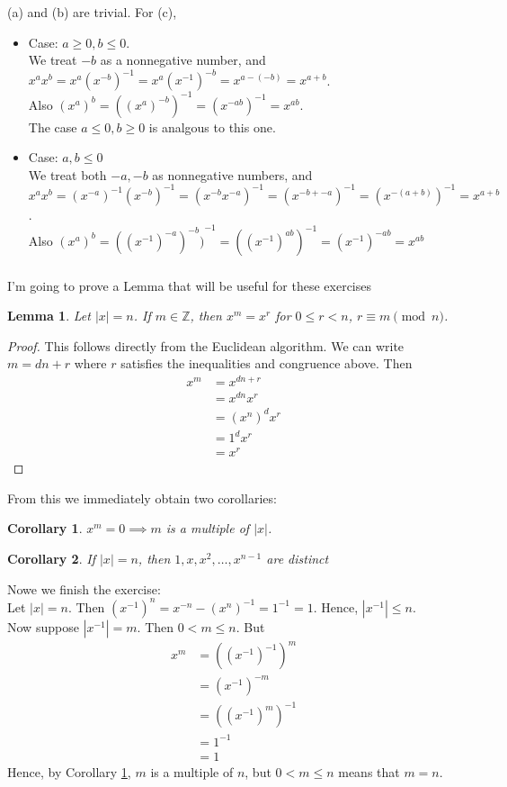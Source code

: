 \documentclass{article}
\newcommand{\ints}{\mathbb{Z}}
\newcommand{\inv}[1]{ {#1}^{-1} }
\newtheorem{corollary}{Corollary}[theorem]
\newtheorem{lemma}[theorem]{Lemma}
\begin{document}
\subsubsection{}
(a) and (b) are trivial. For (c), 
\begin{itemize}
\item Case: $a \geq 0, b \leq 0$.\\
We treat $-b$ as a nonnegative number, and $x^ax^b = x^a\inv{(x^{-b})} = x^a(\inv{x})^{-b} = x^{a-(-b)} = x^{a+b}$.\\
Also $(x^a)^b = \inv{( (x^a)^{-b} )} = \inv{( x^{-ab}  )} = x^{ab}$. \\
The case $a \leq 0, b \geq 0$ is analgous to this one.
\item Case: $a,b \leq 0$\\
We treat both $-a,-b$ as nonnegative numbers, and $x^ax^b = \inv{(x^{-a})}\inv{(x^{-b})} = \inv{( x^{-b}x^{-a} )} = \inv{( x^{-b + -a})} = \inv{( x^{-(a+b)} )} = x^{a+b}$.\\
Also $(x^a)^b = \inv{( (\inv{x})^{-a})^{-b} )} = \inv{( (\inv{x})^{ab} )} = (\inv{x})^{-ab} = x^{ab}$
\end{itemize}
\subsubsection{}\label{ex20}
I'm going to prove a Lemma that will be useful for these exercises
\begin{lemma} \label{lemma1}
Let $|x|=n$. If $m \in \ints$, then $x^m = x^r$ for $0 \leq r < n$, $r \equiv m \pmod{n}$.
\end{lemma}
\begin{proof}
This follows directly from the Euclidean algorithm. We can write $m = dn+r$ where $r$ satisfies the inequalities and congruence above. Then
\begin{align*}
x^m &= x^{dn+r}\\
&= x^{dn}x^r\\
&= (x^n)^dx^r\\
&= 1^d x^r\\
&= x^r
\end{align*}
\end{proof}
From this we immediately obtain two corollaries:
\begin{corollary} \label{cor1p1}
$x^m = 0 \implies m$ is a multiple of $|x|$. 
\end{corollary}
\begin{corollary} \label{cor1p2}
If $|x| = n$, then $1,x,x^2,\ldots,x^{n-1}$ are distinct
\end{corollary}
Nowe we finish the exercise:\\
Let $|x| = n$. Then $(\inv{x})^n = x^{-n} - \inv{(x^n)} = \inv{1} = 1$. Hence, $|\inv{x}| \leq n$. \\
Now suppose $|\inv{x}| = m$. Then $0 < m \leq n$. But
\begin{align*}
x^m &= (\inv{(\inv{x})})^m\\
&= (\inv{x})^{-m}\\
&= \inv{((\inv{x})^m)}\\
&= \inv{1}\\
&= 1
\end{align*}
Hence, by Corollary \ref{cor1p1}, $m$ is a multiple of $n$, but $0 < m \leq n$ means that $m = n$.
\end{document}
